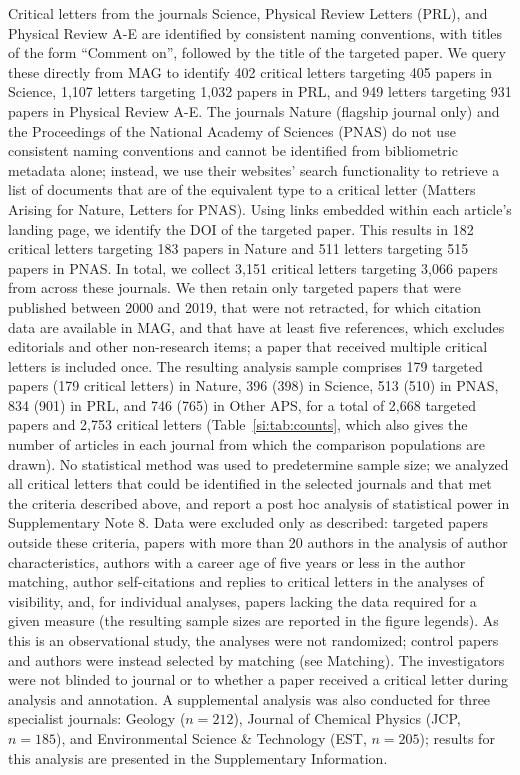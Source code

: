 \documentclass[12pt,a4paper]{article}
\numberwithin{equation}{section}
\def\appendix{Supplementary Information}
\begin{document}
Critical letters from the journals Science, Physical Review Letters (PRL), and Physical Review A-E are identified by consistent naming conventions, with titles of the form ``Comment on'', followed by the title of the targeted paper.
We query these directly from MAG to identify 402 critical letters targeting 405 papers in Science, 1,107 letters targeting 1,032 papers in PRL, and 949 letters targeting 931 papers in Physical Review A-E.
The journals Nature (flagship journal only) and the Proceedings of the National Academy of Sciences (PNAS) do not use consistent naming conventions and cannot be identified from bibliometric metadata alone;
instead, we use their websites' search functionality to retrieve a list of documents that are of the equivalent type to a critical letter (Matters Arising for Nature, Letters for PNAS).
Using links embedded within each article's landing page, we identify the DOI of the targeted paper. 
This results in 182 critical letters targeting 183 papers in Nature and 511 letters targeting 515 papers in PNAS.
In total, we collect 3,151 critical letters targeting 3,066 papers from across these journals.
We then retain only targeted papers that were published between 2000 and 2019, that were not retracted, for which citation data are available in MAG, and that have at least five references, which excludes editorials and other non-research items; a paper that received multiple critical letters is included once.
The resulting analysis sample comprises 179 targeted papers (179 critical letters) in Nature, 396 (398) in Science, 513 (510) in PNAS, 834 (901) in PRL, and 746 (765) in Other APS, for a total of 2,668 targeted papers and 2,753 critical letters (Table~\ref*{si:tab:counts}, which also gives the number of articles in each journal from which the comparison populations are drawn).
No statistical method was used to predetermine sample size; we analyzed all critical letters that could be identified in the selected journals and that met the criteria described above, and report a post hoc analysis of statistical power in Supplementary Note 8.
Data were excluded only as described: targeted papers outside these criteria, papers with more than 20 authors in the analysis of author characteristics, authors with a career age of five years or less in the author matching, author self-citations and replies to critical letters in the analyses of visibility, and, for individual analyses, papers lacking the data required for a given measure (the resulting sample sizes are reported in the figure legends).
As this is an observational study, the analyses were not randomized; control papers and authors were instead selected by matching (see Matching).
The investigators were not blinded to journal or to whether a paper received a critical letter during analysis and annotation.
A supplemental analysis was also conducted for three specialist journals: Geology ($n = 212$), Journal of Chemical Physics (JCP, $n = 185$), and Environmental Science \& Technology (EST, $n = 205$); results for this analysis are presented in the \appendix.
\end{document}
